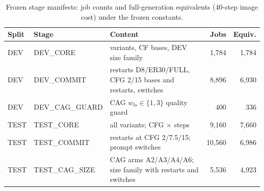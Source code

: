 \begin{table}[t]\centering\small
\caption{Frozen stage manifests: job counts and full-generation equivalents (40-step image cost) under the frozen constants.}\label{tab:design}
\begin{tabular}{llp{6.3cm}rr}
\toprule
Split & Stage & Content & Jobs & Equiv. \\
\midrule
DEV & DEV\_CORE & variants, CF bases, DEV size family & 1,784 & 1,784 \\
DEV & DEV\_COMMIT & restarts D8/ER30/FULL, CFG 2/15 bases and restarts, switches & 8,896 & 6,930 \\
DEV & DEV\_CAG\_GUARD & CAG $w_{lo}\in\{1,3\}$ quality guard & 400 & 336 \\
TEST & TEST\_CORE & all variants; CFG $\times$ steps & 9,160 & 7,660 \\
TEST & TEST\_COMMIT & restarts at CFG 2/7.5/15; prompt switches & 10,560 & 6,986 \\
TEST & TEST\_CAG\_SIZE & CAG arms A2/A3/A4/A6; size family with restarts and switches & 5,536 & 4,923 \\
\bottomrule
\end{tabular}
\end{table}
